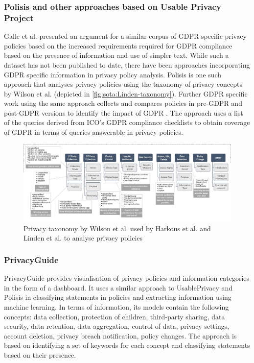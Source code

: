 \subsubsection{Polisis and other approaches based on Usable Privacy Project}
Galle et al. \cite{galle_case_2019} presented an argument for a similar corpus of GDPR-specific privacy policies based on the increased requirements required for GDPR compliance based on the presence of information and use of simpler text. While such a dataset has not been published to date, there have been approaches incorporating GDPR specific information in privacy policy analysis.
Polisis \cite{harkous_polisis_2018} is one such approach that analyses privacy policies using the taxonomy of privacy concepts by Wilson et al. \cite{wilson_creation_2016} (depicted in \autoref{fig:sota:Linden-taxonomy}).
Further GDPR specific work using the same approach collects and compares policies in pre-GDPR and post-GDPR versions to identify the impact of GDPR \cite{linden_privacy_2018}. The approach uses a list of the queries derived from ICO’s GDPR compliance checklists to obtain coverage of GDPR in terms of queries answerable in privacy policies.
\begin{figure}[htbp]
    \centering
    \includegraphics[width=\linewidth]{img/Linden_taxonomy.png}
    \caption{Privacy taxonomy by Wilson et al. \cite{wilson_creation_2016} used by Harkous et al. \cite{harkous_polisis_2018} and Linden et al.  \cite{linden_privacy_2018} to analyse privacy policies}
    \label{fig:sota:Linden-taxonomy}
\end{figure}

\subsubsection{PrivacyGuide}
PrivacyGuide \cite{tesfay_privacyguide_2018,westphal_spirit_2018} provides visualisation of privacy policies and information categories in the form of a dashboard. It uses a similar approach to UsablePrivacy and Polisis in classifying statements in policies and extracting information using machine learning. In terms of information, its models contain the following concepts: data collection, protection of children, third-party sharing, data security, data retention, data aggregation, control of data, privacy settings, account deletion, privacy breach notification, policy changes.
The approach is based on identifying a set of keywords for each concept and classifying statements based on their presence.

